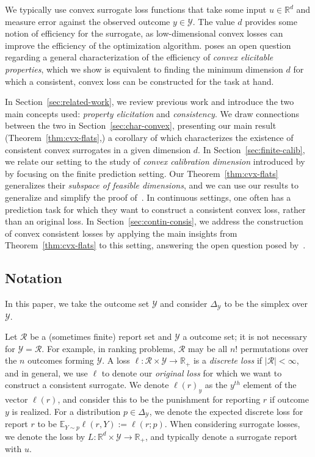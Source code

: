 \documentclass{article}
\newcommand{\reals}{\mathbb{R}}
\newcommand{\simplex}{\Delta_\Y}
\newcommand{\E}{\mathbb{E}}
\newcommand{\R}{\mathcal{R}}
\newcommand{\Y}{\mathcal{Y}}
\begin{document}
We typically use convex surrogate loss functions that take some input $u \in \reals^d$ and measure error against the observed outcome $y \in \Y$.
The value $d$ provides some notion of efficiency for the surrogate, as low-dimensional convex losses can improve the efficiency of the optimization algorithm.
\cite{frongillo2015elicitation} poses an open question regarding a general characterization of the efficiency of \emph{convex elicitable properties}, which we show is equivalent to finding the minimum dimension $d$ for which a consistent, convex loss can be constructed for the task at hand.

In Section~\ref{sec:related-work}, we review previous work and introduce the two main concepts used: \emph{property elicitation} and \emph{consistency}.
We draw connections between the two in Section~\ref{sec:char-convex}, presenting our main result (Theorem~\ref{thm:cvx-flats},) a corollary of which characterizes the existence of consistent convex surrogates in a given dimension $d$.
In Section~\ref{sec:finite-calib}, we relate our setting to the study of \emph{convex calibration dimension} introduced by~\cite{ramaswamy2016convex} by focusing on the finite prediction setting.
Our Theorem~\ref{thm:cvx-flats} generalizes their \emph{subspace of feasible dimensions}, and we can use our results to generalize and simplify the proof of~\cite[Theorem 16]{ramaswamy2016convex}.
In continuous settings, one often has a prediction task for which they want to construct a consistent convex loss, rather than an original loss.
In Section~\ref{sec:contin-consis}, we address the construction of convex consistent losses by applying the main insights from Theorem~\ref{thm:cvx-flats} to this setting, answering the open question posed by~\cite[Section8]{frongillo2018elicitation}.


\subsection{Notation}
In this paper, we take the outcome set $\Y$ and consider $\simplex$ to be the simplex over $\Y$. 

Let $\R$ be a (sometimes finite) report set and $\Y$ a outcome set; it is not necessary for $\Y = \R$.  
For example, in ranking problems, $\R$ may be all $n!$ permutations over the $n$ outcomes forming $\Y$.
A loss $\ell : \R \times \Y \to \reals_+$ is a \emph{discrete loss} if $|\R| < \infty$, and in general, we use $\ell$ to denote our \emph{original loss} for which we want to construct a consistent surrogate.
We denote $\ell(r)_y$ as the $y^{th}$ element of the vector $\ell(r)$, and consider this to be the punishment for reporting $r$ if outcome $y$ is realized.
For a distribution $p \in \simplex$, we denote the expected discrete loss for report $r$ to be $\E_{Y \sim p} \ell(r, Y) := \ell(r; p)$.
When considering surrogate losses, we denote the loss by $L : \reals^d \times \Y \to \reals_+$, and typically denote a surrogate report with $u$.
\end{document}
